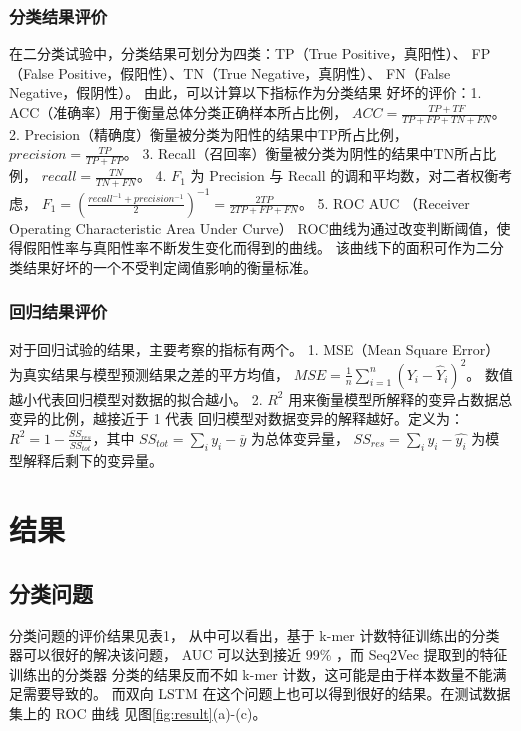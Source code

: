 \documentclass[UTF8]{ctexart}
\begin{document}
  \subsubsection{分类结果评价}
  在二分类试验中，分类结果可划分为四类：TP（True Positive，真阳性）、
  FP（False Positive，假阳性）、TN（True Negative，真阴性）、
  FN（False Negative，假阴性）。 由此，可以计算以下指标作为分类结果
  好坏的评价：1. ACC（准确率）用于衡量总体分类正确样本所占比例，
  $ACC = \frac{TP + TF}{TP+FP+TN+FN}$。
  2. Precision（精确度）衡量被分类为阳性的结果中TP所占比例，
  $precision = \frac{TP}{TP+FP}$。
  3. Recall（召回率）衡量被分类为阴性的结果中TN所占比例，
  $recall = \frac{TN}{TN+FN}$。
  4. $F_1$ 为 Precision 与 Recall 的调和平均数，对二者权衡考虑，
  $F_1 = (\frac{recall^{-1}+precision^{-1}}{2})^{-1} = \frac{2TP}{2TP+FP+FN}$。
  5. ROC AUC （Receiver Operating Characteristic Area Under Curve） 
  ROC曲线为通过改变判断阈值，使得假阳性率与真阳性率不断发生变化而得到的曲线。
  该曲线下的面积可作为二分类结果好坏的一个不受判定阈值影响的衡量标准。

  \subsubsection{回归结果评价}
  对于回归试验的结果，主要考察的指标有两个。
  1. MSE（Mean Square Error）为真实结果与模型预测结果之差的平方均值，
  $MSE = \frac{1}{n} \sum_{i=1}^{n}{(Y_i - \hat{Y}_i)^2}$。
  数值越小代表回归模型对数据的拟合越小。
  2. $R^2$ 用来衡量模型所解释的变异占数据总变异的比例，越接近于 1 代表
  回归模型对数据变异的解释越好。定义为：
  $R^2 = 1 - \frac{SS_{res}}{SS_{tot}}$，其中
  $SS_{tot} = \sum_{i}{y_i - \overline{y}}$ 为总体变异量，
  $SS_{res} = \sum_{i}{y_i - \hat{y_i}}$ 为模型解释后剩下的变异量。

  \section{结果}
  \subsection{分类问题}
  分类问题的评价结果见表1，
  从中可以看出，基于 k-mer 计数特征训练出的分类器可以很好的解决该问题，
  AUC 可以达到接近 99\% ，而 Seq2Vec 提取到的特征训练出的分类器
  分类的结果反而不如 k-mer 计数，这可能是由于样本数量不能满足需要导致的。
  而双向 LSTM 在这个问题上也可以得到很好的结果。在测试数据集上的 ROC 曲线
  见图\ref{fig:result}(a)-(c)。
\end{document}
